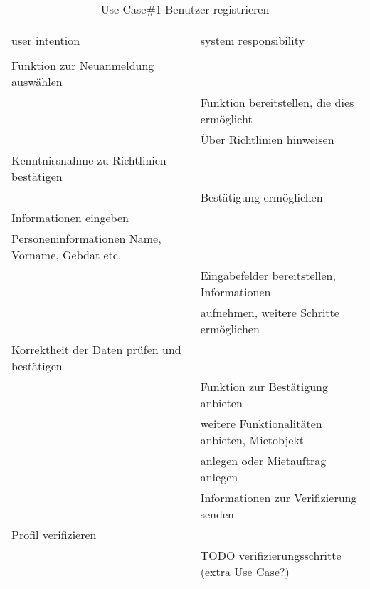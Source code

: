\begin{table}[H]
\caption{Use Case\#1 Benutzer registrieren }
\centering
\begin{tabular}{l l}
\\ [-0.5ex]

\hline\hline
\\ [-0.5ex]
user intention & system responsibility
\\ [1.5ex]
\hline
\\ [-0.5ex]
Funktion zur Neuanmeldung auswählen 				& 												\\[1ex]
													& Funktion bereitstellen, die dies ermöglicht	\\[1ex]
													& Über Richtlinien hinweisen 					\\[1ex]
Kenntnissnahme zu Richtlinien bestätigen			& 												\\[1ex]
													& Bestätigung ermöglichen						\\[1ex]
Informationen eingeben 								& 												\\[1ex] 
Personeninformationen Name, Vorname, Gebdat etc. 	& 												\\[1ex] 
													& Eingabefelder bereitstellen, Informationen    \\[1ex]
													& aufnehmen, weitere Schritte ermöglichen		\\[1ex]
Korrektheit der Daten prüfen und bestätigen			& 												\\[1ex]
													& Funktion zur Bestätigung anbieten 			\\[1ex]
													& weitere Funktionalitäten anbieten, Mietobjekt \\[1ex]
													& anlegen oder Mietauftrag anlegen				\\[1ex]
													& Informationen zur Verifizierung senden		\\[1ex]
Profil verifizieren									& 												\\[1ex]
													& TODO verifizierungsschritte (extra Use Case?)	\\[1ex]


\hline
\end{tabular}
\label{tab:anmeldenUC}
\end{table}

